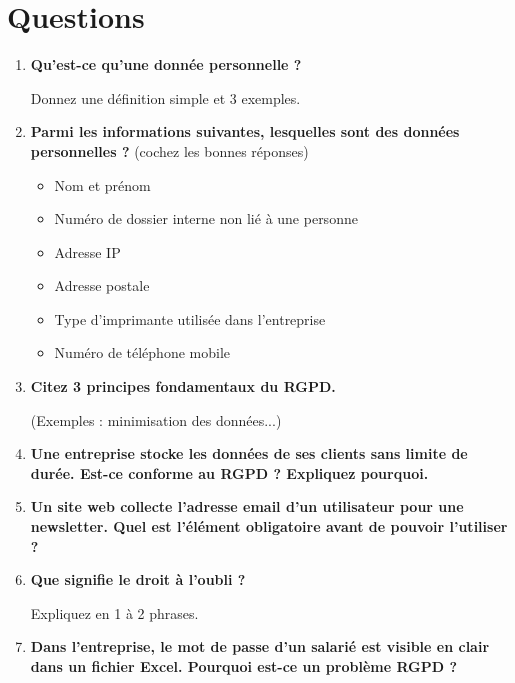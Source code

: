 \documentclass[a4paper, 11pt]{article}
\begin{document}
\section*{Questions}
\begin{enumerate}
    \item \textbf{Qu'est-ce qu'une donnée personnelle ?}
    
    Donnez une définition simple et 3 exemples.
    
    \item \textbf{Parmi les informations suivantes, lesquelles sont des données personnelles ?} (cochez les bonnes réponses)
    
    \begin{itemize}
        \item[$\square$] Nom et prénom
        \item[$\square$] Numéro de dossier interne non lié à une personne
        \item[$\square$] Adresse IP
        \item[$\square$] Adresse postale
        \item[$\square$] Type d'imprimante utilisée dans l'entreprise
        \item[$\square$] Numéro de téléphone mobile
    \end{itemize}
    
    \item \textbf{Citez 3 principes fondamentaux du RGPD.}
    
    (Exemples : minimisation des données...)
    
    \item \textbf{Une entreprise stocke les données de ses clients sans limite de durée. Est-ce conforme au RGPD ? Expliquez pourquoi.}
    
    \item \textbf{Un site web collecte l'adresse email d'un utilisateur pour une newsletter. Quel est l'élément obligatoire avant de pouvoir l'utiliser ?}
    
    \item \textbf{Que signifie le droit à l'oubli ?}
    
    Expliquez en 1 à 2 phrases.
    
    \item \textbf{Dans l'entreprise, le mot de passe d'un salarié est visible en clair dans un fichier Excel. Pourquoi est-ce un problème RGPD ?}
    
\end{enumerate}
\end{document}
